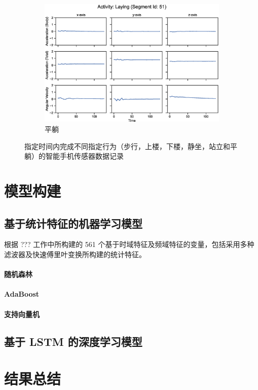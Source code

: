 \documentclass[screen,17pt,cn,founder,mtpro2]{elegantnote}
\begin{document}
\begin{figure}
\begin{subfigure}{.33\textwidth}
        \includegraphics[width=\linewidth]{images/activity-laying-segment-51.eps}
        \caption{平躺}
    \end{subfigure}
    \caption{指定时间内完成不同指定行为（步行，上楼，下楼，静坐，站立和平躺）的智能手机传感器数据记录}
\end{figure}
\clearpage

\section{模型构建}

\subsection{基于统计特征的机器学习模型}

根据 ??? 工作中所构建的 561 个基于时域特征及频域特征的变量，包括采用多种滤波器及快速傅里叶变换所构建的统计特征。

\paragraph{随机森林}

\paragraph{AdaBoost}

\paragraph{支持向量机}

\clearpage

\subsection{基于 LSTM 的深度学习模型}


\clearpage

\section{结果总结}
\end{document}
